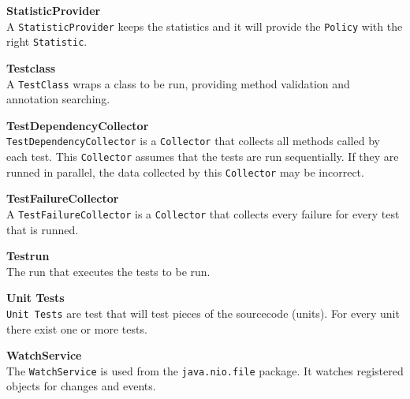 \documentclass[i2]{oss}
\newcommand{\class}[1]{\texttt{#1}}
\newcommand{\gloss}[1]{\textbf{#1}}
\begin{document}
\begin{description}
\item \gloss{StatisticProvider} \\
A \class{StatisticProvider} keeps the statistics and it will provide the \class{Policy} with the right \class{Statistic}.

\item \gloss{Testclass} \\
 A \class{TestClass} wraps a class to be run, providing method validation and annotation searching.

\item \gloss{TestDependencyCollector} \\
\class{TestDependencyCollector} is a \class{Collector} that collects all methods called by each test. This \class{Collector} assumes that the tests are run sequentially. If they are runned in parallel, the data collected by this \class{Collector} may be incorrect.

\item \gloss{TestFailureCollector} \\
A \class{TestFailureCollector} is a \class{Collector} that collects every failure for every test that is runned.


\item \gloss{Testrun} \\ 
	The run that executes the tests to be run.


\item \gloss{Unit Tests} \\
\class{Unit Tests} are test that will test pieces of the sourcecode (units). For every unit there exist one or more tests. 

\item \gloss{WatchService} \\
The \class{WatchService} is used from the \class{java.nio.file} package. It watches registered objects for changes and events.

\end{description}
\end{document}
